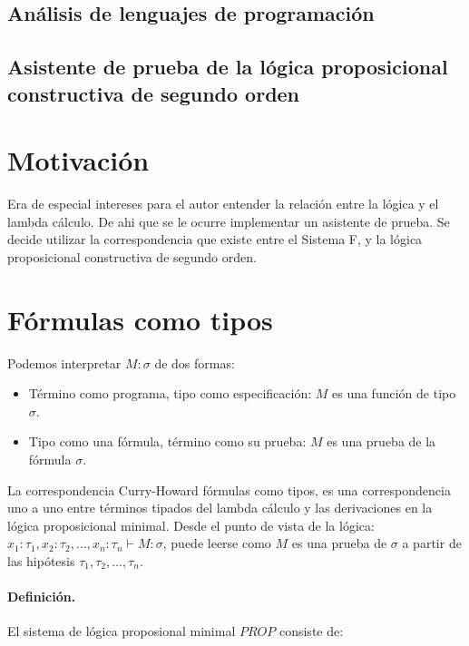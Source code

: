 \documentclass[a4paper,11pt]{article}
\title{}
\author{}
\begin{document}
\maketitle


\begin{center}
\section*{Análisis de lenguajes de programación} 
\subsection*{Asistente de prueba de la lógica proposicional constructiva de segundo orden}
\end{center}

\newpage{\pagestyle{empty}\cleardoublepage}


\section{Motivación}
Era de especial intereses para el autor entender la relación entre la lógica y el lambda cálculo.
De ahi que se le ocurre implementar un asistente de prueba. Se decide utilizar la correspondencia
que existe entre el Sistema F, y la lógica proposicional constructiva de segundo orden.
 
\section{Fórmulas como tipos}
Podemos interpretar $M : \sigma$ de dos formas:
\begin{itemize}
  \item Término como programa, tipo como especificación: $M$ es una función de tipo $\sigma$.
  \item Tipo como una fórmula, término como su prueba: $M$ es una prueba de la fórmula $\sigma$.
\end{itemize}

La correspondencia Curry-Howard fórmulas como tipos, es una correspondencia uno a uno entre términos
tipados del lambda cálculo y las derivaciones en la lógica proposicional minimal.
Desde el punto de vista de la lógica: $x_{1}:\tau_{1}, x_{2}:\tau_{2}, \ldots, x_{n}:\tau_{n} \vdash M : \sigma$,
puede leerse como $M$ es una prueba de $\sigma$ a partir de las hipótesis $\tau_{1}, \tau_{2}, \ldots, \tau_{n}$.

\paragraph{Definición.}  El sistema de lógica proposional minimal $PROP$ consiste de:
\end{document}
